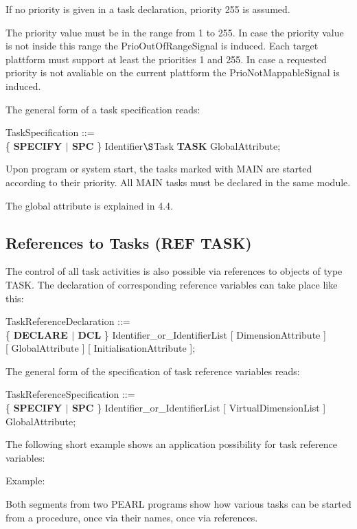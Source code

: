 If no priority is given in a task declaration, priority 255 is assumed.
\begin{added}
The priority value must be in the range from 1 to 255. 
In case the priority value is not inside this range the PrioOutOfRangeSignal
is induced. Each target plattform must support at least the priorities 1 and 255. In case a requested priority is not avaliable on the current plattform
the PrioNotMappableSignal is induced.
\end{added}


The general form of a task specification reads:

TaskSpecification ::=\\
\x \{ {\bf SPECIFY $\mid$ SPC} \} Identifier$\S $Task {\bf TASK} GlobalAttribute;

Upon program or system start, the tasks marked with MAIN are started
according to their priority. All MAIN tasks must be declared in the same
module.

The global attribute is explained in 4.4.

\subsection{References to Tasks (REF TASK)}   %

The control of all task activities is also possible via references to
objects of type TASK. The declaration of corresponding reference
variables can take place like this:

TaskReferenceDeclaration ::= \\
\x \{ {\bf DECLARE $\mid$ DCL} \} Identifier\_or\_IdentifierList [ DimensionAttribute ]\\
 [ GlobalAttribute ] [ InitialisationAttribute ];

The general form of the specification of task reference variables reads:

TaskReferenceSpecification ::= \\
\x \{ {\bf SPECIFY $\mid$ SPC} \} Identifier\_or\_IdentifierList [ VirtualDimensionList ] \\
 GlobalAttribute;

The following short example shows an application possibility for task
reference variables:

Example:

Both segments from two PEARL programs show how various tasks can be
started from a procedure, once via their names, once via references.

